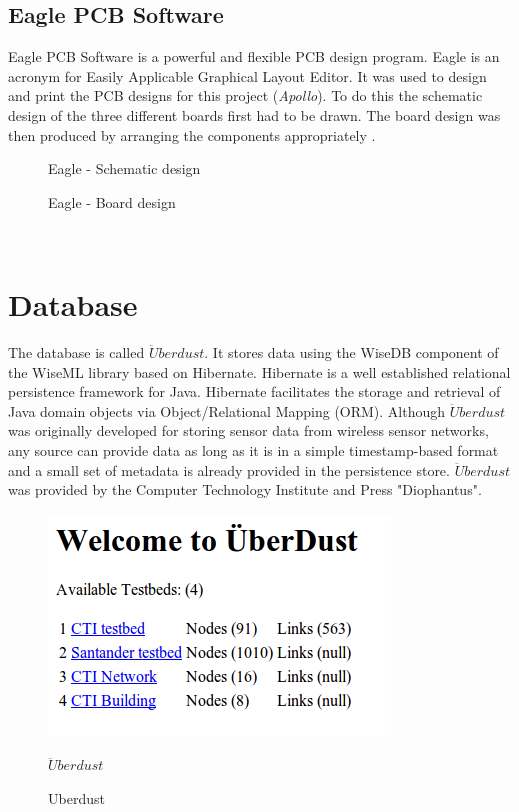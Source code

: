 \documentclass[12pt,a4paper]{report}
\begin{document}
\subsection{Eagle PCB Software}
Eagle PCB Software is a powerful and flexible PCB design program. Eagle is an acronym for Easily Applicable Graphical Layout Editor. It was used to design and print the PCB designs for this project (\emph{Apollo}). To do this the schematic design of the three different boards first had to be drawn. The board design was then produced by arranging the components appropriately \cite{website:eagle}.
\begin{figure}[H]
\centering
    \caption{Eagle - Schematic design}

    \caption{Eagle - Board design}
\end{figure}
\ \\
\section{Database}
The database is called $\ddot{U}berdust$. It stores data using the WiseDB component of the WiseML library based on Hibernate. Hibernate is a well established relational persistence framework for Java. Hibernate facilitates the storage and retrieval of Java domain objects via Object/Relational Mapping (ORM). Although $\ddot{U}berdust$ was originally developed for storing sensor data from wireless sensor networks, any source can provide data as long as it is in a simple timestamp-based format and a small set of metadata is already provided in the persistence store. $\ddot{U}berdust$ was provided by the Computer Technology Institute and Press "Diophantus". \cite{website:database} \\
%
\begin{figure}[H]
\centering
    \includegraphics*[scale=0.4]{Uberdust}
    \caption{$\ddot{U}berdust$}

    \caption{Uberdust}
\end{figure}
\ \\
%
\newpage
%
\end{document}
